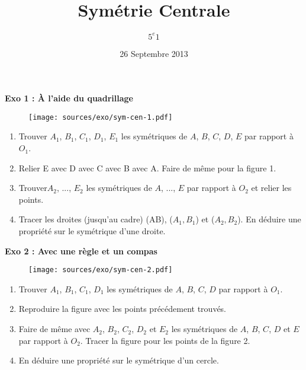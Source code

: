 \documentclass[11pt]{article}
\title{Symétrie Centrale} %
\author{$5^e 1$}
\date{26 Septembre 2013} %
\begin{document}
\maketitle %

\thispagestyle{empty}
\textbf{Exo 1 : À l'aide du quadrillage}

\begin{figure}[H]
  \centering
  \texttt{[image: sources/exo/sym-cen-1.pdf]}
  \label{fig:exo1}
\end{figure}

\begin{enumerate}
\item Trouver $A_1$, $B_1$, $C_1$, $D_1$, $E_1$ les symétriques de $A$, $B$, $C$, $D$, $E$ par rapport à $O_1$.
\item Relier E avec D avec C avec B avec A. Faire de même pour la figure 1.
\item Trouver$A_2$, ..., $E_2$ les symétriques de $A$, ..., $E$ par rapport à $O_2$ et relier les points.
\item Tracer les droites (jusqu'au cadre) (AB), ($A_1, B_1$) et ($A_2, B_2$). En déduire une propriété sur le symétrique d'une droite.
\end{enumerate}

\textbf{Exo 2 : Avec une règle et un compas}

\begin{figure}[H]
  \centering
  \texttt{[image: sources/exo/sym-cen-2.pdf]}
  \label{fig:exo2}
\end{figure}
\begin{enumerate}
\item Trouver $A_1$, $B_1$, $C_1$, $D_1$ les symétriques de $A$, $B$, $C$, $D$ par rapport à $O_1$.
\item Reproduire la figure avec les points précédement trouvés.
\item Faire de même avec $A_2$, $B_2$, $C_2$, $D_2$ et $E_2$ les symétriques de $A$, $B$, $C$, $D$ et $E$ par rapport à $O_2$. Tracer la figure pour les points de la figure 2.
\item En déduire une propriété sur le symétrique d'un cercle.
\end{enumerate}
\end{document}
